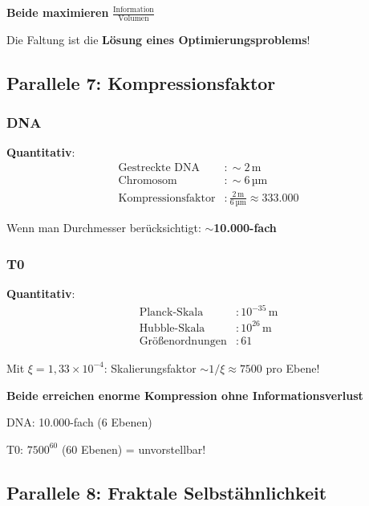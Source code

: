 	\begin{keyresult}
		\textbf{Beide maximieren} $\frac{\text{Information}}{\text{Volumen}}$
		
		Die Faltung ist die \textbf{Lösung eines Optimierungsproblems}!
	\end{keyresult}
	
	\subsection{Parallele 7: Kompressionsfaktor}
	
	\subsubsection{DNA}
	
	\textbf{Quantitativ}:
	\begin{align}
		\text{Gestreckte DNA} &: \sim 2\,\text{m} \\
		\text{Chromosom} &: \sim 6\,\text{µm} \\
		\text{Kompressionsfaktor} &: \frac{2\,\text{m}}{6\,\text{µm}} \approx 333{.}000
	\end{align}
	
	Wenn man Durchmesser berücksichtigt: $\sim$\textbf{10.000-fach}
	
	\subsubsection{T0}
	
	\textbf{Quantitativ}:
	\begin{align}
		\text{Planck-Skala} &: 10^{-35}\,\text{m} \\
		\text{Hubble-Skala} &: 10^{26}\,\text{m} \\
		\text{Größenordnungen} &: 61
	\end{align}
	
	Mit $\xi = 1{,}33 \times 10^{-4}$: Skalierungsfaktor $\sim 1/\xi \approx 7500$ pro Ebene!
	
	\begin{keyresult}
		\textbf{Beide erreichen enorme Kompression ohne Informationsverlust}
		
		DNA: 10.000-fach (6 Ebenen)
		
		T0: $7500^{60}$ (60 Ebenen) = unvorstellbar!
	\end{keyresult}
	
	\subsection{Parallele 8: Fraktale Selbstähnlichkeit}
	

